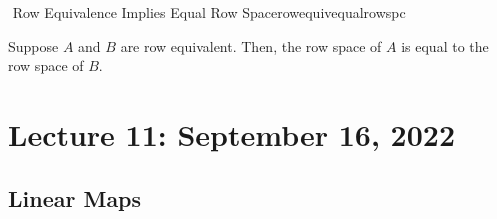         \begin{theorem}{\Stop\,\,Row Equivalence Implies Equal Row Space}{rowequivequalrowspc}
            
            Suppose \(A\) and \(B\) are row equivalent. Then, the row space of \(A\) is equal to the row space of \(B\).
        
        \end{theorem}

\pagebreak

\section{Lecture 11: September 16, 2022}

    \subsection{Linear Maps}
    
